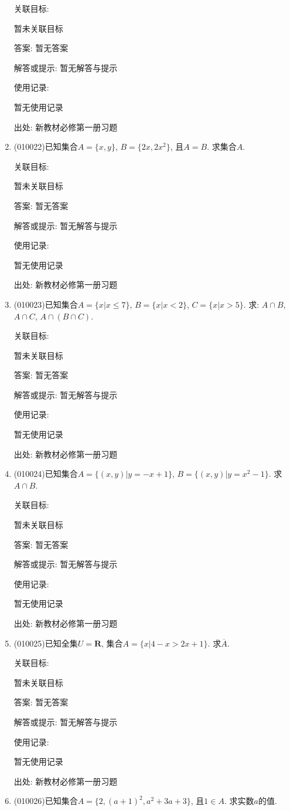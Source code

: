 \documentclass[10pt,a4paper]{article}
\begin{document}
\begin{enumerate}[1.]
关联目标:

暂未关联目标

答案: 暂无答案

解答或提示: 暂无解答与提示

使用记录:

暂无使用记录


出处: 新教材必修第一册习题
\item { (010022)}已知集合$A=\{x, y\}$, $B=\{2x, 2x^2\}$, 且$A=B$. 求集合$A$.


关联目标:

暂未关联目标

答案: 暂无答案

解答或提示: 暂无解答与提示

使用记录:

暂无使用记录


出处: 新教材必修第一册习题
\item { (010023)}已知集合$A=\{x|x\le 7\}$, $B=\{x|x<2\}$, $C=\{x|x>5\}$. 求: $A\cap B$, $A\cap C$, $A\cap (B\cap C)$.


关联目标:

暂未关联目标

答案: 暂无答案

解答或提示: 暂无解答与提示

使用记录:

暂无使用记录


出处: 新教材必修第一册习题
\item { (010024)}已知集合$A=\{(x, y)|y=-x+1\}$, $B=\{(x, y)|y=x^2-1\}$. 求$A\cap B$.


关联目标:

暂未关联目标

答案: 暂无答案

解答或提示: 暂无解答与提示

使用记录:

暂无使用记录


出处: 新教材必修第一册习题
\item { (010025)}已知全集$U=\mathbf{R}$, 集合$A=\{x|4-x>2x+1\}$. 求$\overline A$.


关联目标:

暂未关联目标

答案: 暂无答案

解答或提示: 暂无解答与提示

使用记录:

暂无使用记录


出处: 新教材必修第一册习题
\item { (010026)}已知集合$A=\{2, (a+1)^2, a^2+3a+3\}$, 且$1\in A$. 求实数$a$的值.



\end{enumerate}
\end{document}
